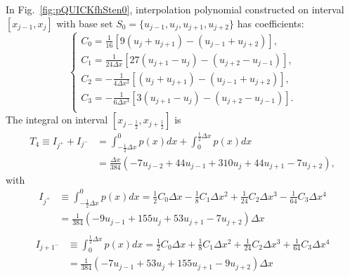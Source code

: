 \documentclass[]{article}
\newcommand{\diff}{d}
\def\jph{{j+\frac{1}{2}}}
\def\jmh{{j-\frac{1}{2}}}
\begin{document}
In Fig.~\ref{fig:pQUICKfhSten0}, interpolation polynomial constructed on
interval $[x_{j-1}, x_j]$ with base set $S_0 = \{u_{j-1}, u_j, u_{j+1},
u_{j+2}\}$ has coefficients:
\[
\left\{\begin{array}{ll}
\displaystyle
C_0=\frac{1}{16}\left[9(u_j+u_{j+1})-(u_{j-1}+u_{j+2})\right],\\[3mm]
\displaystyle
C_1 = \frac{1}{24\Delta x}\left[27(u_{j+1}-u_j)-(u_{j+2}-u_{j-1})\right],\\[3mm]
\displaystyle
C_2 = -\frac{1}{4\Delta x^2}\left[(u_{j}+u_{j+1})-(u_{j-1}+u_{j+2})\right],\\[3mm]
\displaystyle
C_3 = -\frac{1}{6\Delta x^3}\left[3(u_{j+1}-u_j)-(u_{j+2}-u_{j-1})\right].\\
\end{array}\right.
\]
The integral on interval $[x_\jmh, x_\jph]$ is
\begin{align*}
T_4\equiv I_{j^+} + I_{j^-} &= \int_{-\frac12\Delta x}^0 p(x) \diff x + 
\int_0^{\frac12\Delta x} p(x) \diff x \\
&= \frac{\Delta x}{384}(-7 u_{j-2}+44u_{j-1}+310 u_j+44 u_{j+1}-7 u_{j+2}),
\end{align*}
with
\[
\begin{array}{ll}
I_{j^+} &\displaystyle \equiv\int_{-\frac{1}{2}\Delta x}^0 p(x)dx = \frac{1}{2}C_0\Delta x-\frac{1}{8}C_1\Delta x^2+\frac{1}{24}C_2\Delta x^3-\frac{1}{64}C_3\Delta x^4 \\[4mm]
&\displaystyle
= \frac{1}{384}(-9 u_{j-1}+155u_j+53u_{j+1}-7u_{j+2})\Delta x\\
\end{array}
\]
\[
\begin{array}{ll}
I_{j+1^-} &\displaystyle \equiv\int_0^{\frac{1}{2}\Delta x} p(x)dx = \frac{1}{2}C_0\Delta x+\frac{1}{8}C_1\Delta x^2+\frac{1}{24}C_2\Delta x^3+\frac{1}{64}C_3\Delta x^4 \\[4mm]
&\displaystyle
= \frac{1}{384}(-7 u_{j-1}+53u_j+155u_{j+1}-9u_{j+2})\Delta x\\
\end{array}
\]
\end{document}
